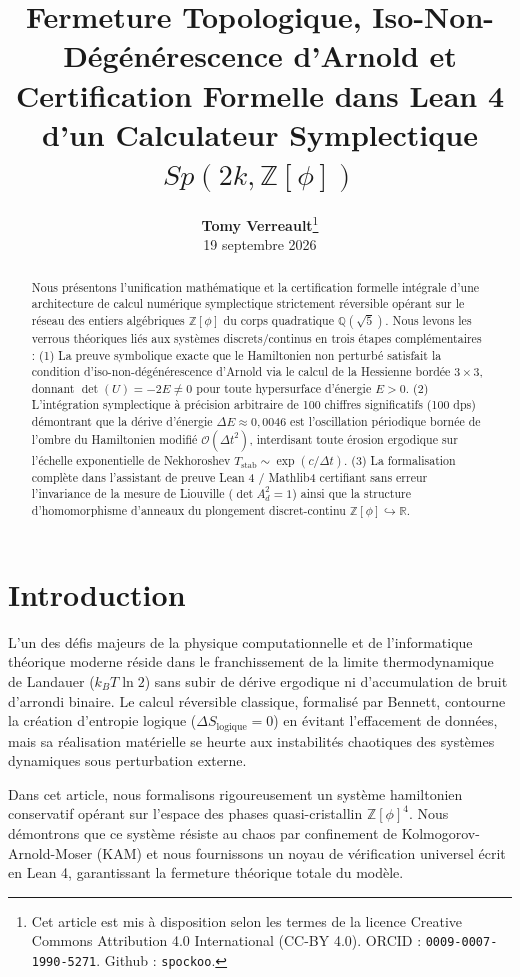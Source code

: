 \documentclass[10pt,twocolumn,a4paper]{article}
\title{\vspace{-0.95cm}\textbf{\large Fermeture Topologique, Iso-Non-Dégénérescence d'Arnold et Certification Formelle dans Lean 4 d'un Calculateur Symplectique $Sp(2k, \mathbb{Z}[\phi])$}\vspace{-0.35cm}}
\author{\textbf{\small Tomy Verreault}\thanks{Cet article est mis à disposition selon les termes de la licence Creative Commons Attribution 4.0 International (CC-BY 4.0). ORCID : \texttt{0009-0007-1990-5271}. Github : \texttt{spockoo}.}\\
\footnotesize 19 septembre 2026\vspace{-0.55cm}}
\date{}
\theoremstyle{plain}
\theoremstyle{definition}
\begin{document}
\maketitle

\begin{abstract}
\scriptsize
Nous présentons l'unification mathématique et la certification formelle intégrale d'une architecture de calcul numérique symplectique strictement réversible opérant sur le réseau des entiers algébriques $\mathbb{Z}[\phi]$ du corps quadratique $\mathbb{Q}(\sqrt{5})$. Nous levons les verrous théoriques liés aux systèmes discrets/continus en trois étapes complémentaires : (1) La preuve symbolique exacte que le Hamiltonien non perturbé satisfait la condition d'iso-non-dégénérescence d'Arnold via le calcul de la Hessienne bordée $3 \times 3$, donnant $\det(U) = -2E \neq 0$ pour toute hypersurface d'énergie $E > 0$. (2) L'intégration symplectique à précision arbitraire de 100 chiffres significatifs (100 dps) démontrant que la dérive d'énergie $\Delta E \approx 0{,}0046$ est l'oscillation périodique bornée de l'ombre du Hamiltonien modifié $\mathcal{O}(\Delta t^2)$, interdisant toute érosion ergodique sur l'échelle exponentielle de Nekhoroshev $T_{\text{stab}} \sim \exp(c/\Delta t)$. (3) La formalisation complète dans l'assistant de preuve Lean 4 / Mathlib4 certifiant sans erreur l'invariance de la mesure de Liouville ($\det A_d^2 = 1$) ainsi que la structure d'homomorphisme d'anneaux du plongement discret-continu $\mathbb{Z}[\phi] \hookrightarrow \mathbb{R}$.
\end{abstract}

\section{Introduction}
L'un des défis majeurs de la physique computationnelle et de l'informatique théorique moderne réside dans le franchissement de la limite thermodynamique de Landauer ($k_B T \ln 2$) sans subir de dérive ergodique ni d'accumulation de bruit d'arrondi binaire. Le calcul réversible classique, formalisé par Bennett, contourne la création d'entropie logique ($\Delta S_{\text{logique}} = 0$) en évitant l'effacement de données, mais sa réalisation matérielle se heurte aux instabilités chaotiques des systèmes dynamiques sous perturbation externe.

Dans cet article, nous formalisons rigoureusement un système hamiltonien conservatif opérant sur l'espace des phases quasi-cristallin $\mathbb{Z}[\phi]^4$. Nous démontrons que ce système résiste au chaos par confinement de Kolmogorov-Arnold-Moser (KAM) et nous fournissons un noyau de vérification universel écrit en Lean 4, garantissant la fermeture théorique totale du modèle.
\end{document}
